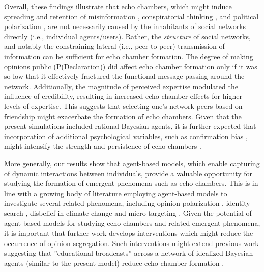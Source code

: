 \documentclass[doc,floatsintext]{apa6}
\begin{document}
Overall, these findings illustrate that echo chambers, which might induce spreading and retention of misinformation \citep{del2016spreading, tornberg2018echo}, conspiratorial thinking \citep{jasny2015empirical, jasny2019echo}, and political polarization \citep{del2016echo, boutyline2017social, takikawa2017political}, are not necessarily caused by the inhabitants of social networks directly (i.e., individual agents/users). Rather, the \textit{structure} of social networks, and notably the constraining lateral (i.e., peer-to-peer) transmission of information can be sufficient for echo chamber formation.
The degree of making opinions public (P(Declaration)) did affect echo chamber formation only if it was so low that it effectively fractured the functional message passing around the network. Additionally, the magnitude of perceived expertise modulated the influence of credibility, resulting in increased echo chamber effects for higher levels of expertise. This suggests that selecting one's network peers based on friendship might exacerbate the formation of echo chambers. Given that the present simulations included rational Bayesian agents, it is further expected that incorporation of additional psychological variables, such as confirmation bias \citep{del2016spreading, ngampruetikorn2016bias}, might intensify the strength and persistence of echo chambers \citep{pilditch2017opinion}.

More generally, our results show that agent-based models, which enable capturing of dynamic interactions between individuals, provide a valuable opportunity for studying the formation of emergent phenomena such as echo chambers. This is in line with a growing body of literature employing agent-based models to investigate several related phenomena, including opinion polarization \citep{duggins2017}, identity search \citep{watts2002identity}, disbelief in climate change \citep{lewandowsky2019influence} and micro-targeting \citep{madsen2018method}. Given the potential of agent-based models for studying echo chambers and related emergent phenomena, it is important that further work develops interventions which might reduce the occurrence of opinion segregation. Such interventions might extend previous work suggesting that ''educational broadcasts'' across a network of idealized Bayesian agents (similar to the present model) reduce echo chamber formation \citep{madsen2018large}.
\end{document}
